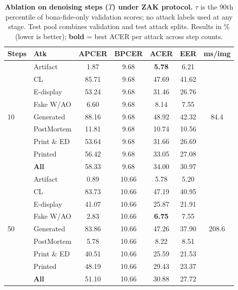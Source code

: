 \begin{table}[!htbp]
\centering
\scriptsize
\setlength{\tabcolsep}{3pt}
\caption{\textbf{Ablation on denoising steps ($T$) under ZAK protocol.}
$\tau$ is the 90th percentile of bona-fide-only validation scores; no attack labels used at any stage.
Test pool combines validation and test attack splits.
Results in \% (lower is better); \textbf{bold} = best ACER per attack across step counts.}
\label{tab:ablation_study2}

\begin{tabular}{l l c c c c c}
\toprule
\textbf{Steps} & \textbf{Atk} & APCER & BPCER & ACER & EER & ms/img \\
\midrule

\multirow{9}{*}{10}
& Artifact       &   1.87 &   9.68 &        \textbf{5.78} &    6.21 & \multirow{9}{*}{84.4} \\
& CL             &  85.71 &   9.68 &                47.69 &   41.62 &  \\
& E-display      &  53.24 &   9.68 &                31.46 &   26.76 &  \\
& Fake W/AO      &   6.60 &   9.68 &                 8.14 &    7.55 &  \\
& Generated      &  88.16 &   9.68 &                48.92 &   42.32 &  \\
& PostMortem     &  11.81 &   9.68 &                10.74 &   10.56 &  \\
& Print \& ED    &  53.64 &   9.68 &                31.66 &   26.69 &  \\
& Printed        &  56.42 &   9.68 &                33.05 &   27.08 &  \\
& \textbf{All} &  58.33 &   9.68 &                34.00 &   30.97 & \\
\midrule

\multirow{9}{*}{50}
& Artifact       &   0.89 &  10.66 &                 5.78 &    5.20 & \multirow{9}{*}{208.6} \\
& CL             &  83.73 &  10.66 &                47.19 &   40.95 &  \\
& E-display      &  41.07 &  10.66 &                25.87 &   21.91 &  \\
& Fake W/AO      &   2.83 &  10.66 &        \textbf{6.75} &    7.55 &  \\
& Generated      &  83.86 &  10.66 &                47.26 &   37.90 &  \\
& PostMortem     &   5.78 &  10.66 &                 8.22 &    8.51 &  \\
& Print \& ED    &  40.51 &  10.66 &                25.59 &   21.53 &  \\
& Printed        &  48.19 &  10.66 &                29.43 &   23.37 &  \\
& \textbf{All} &  51.10 &  10.66 &                30.88 &   27.72 & \\
\midrule


\end{tabular}
\end{table}

